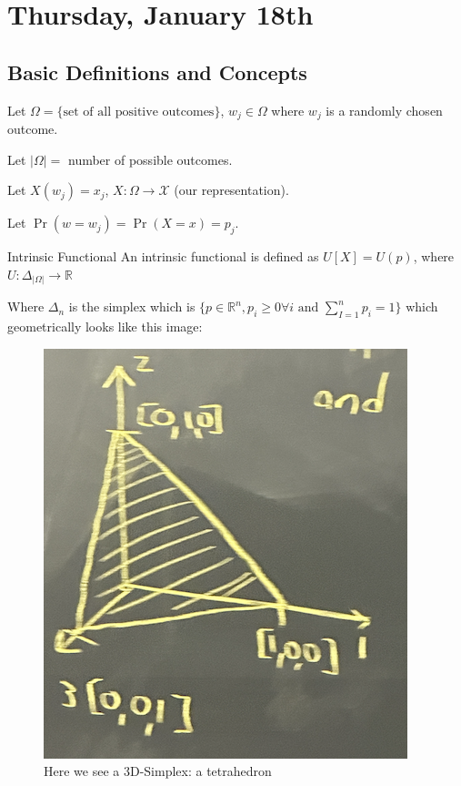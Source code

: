 \section{Thursday, January 18th}
\subsection{Basic Definitions and Concepts}

Let \( \Omega = \{\text{set of all positive outcomes}\} \), \( w_j \in \Omega \) where \( w_j \) is a randomly chosen outcome.

Let \( |\Omega| = \) number of possible outcomes.

Let \( X(w_j) = x_j \), \( X: \Omega \rightarrow \mathcal{X} \) (our representation).

Let \( \Pr(w=w_j)=\Pr(X=x)=p_j \).

\begin{defn}{Intrinsic Functional}
An intrinsic functional is defined as \( U[X] = U(p) \), where \( U: \Delta_{|\Omega|} \rightarrow \mathbb{R} \)

Where \( \Delta_n \) is the simplex which is \( \{p \in \mathbb{R}^n , p_i \geq 0 \forall i \text{ and } \sum_{I=1}^n p_i = 1\} \) which geometrically looks like this image:
\begin{figure}[H]
    \centering
    \includegraphics[scale=0.6]{lectures/wk1/img/simplex.png}
    \caption{Here we see a 3D-Simplex: a tetrahedron}
    \label{fig:simplex}
\end{figure}
\end{defn}

